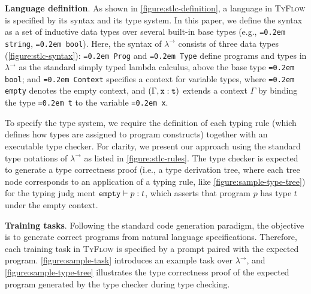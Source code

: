 \documentclass[manuscript,screen]{acmart}
\newcommand{\stlctype}[3]{{#1} \vdash {#2} : {#3}}
\newcommand{\toolname}[1]{\textsc{#1}}
\newcommand{\tcode}[1]{{\small \texttt{\spaceskip=0.2em #1}}}
\newcommand{\mainname}{\toolname{TyFlow}\xspace}
\newcommand{\stlc}{\lambda^{\rightarrow}}
\begin{document}
\smallskip 
\noindent \textbf{Language definition}. As shown in \autoref{figure:stlc-definition}, a language in \mainname is specified by its syntax and its type system.
%
In this paper, we define the syntax as a set of inductive data types over several built-in base types (e.g., \tcode{string}, \tcode{bool}). 
Here, the syntax of $\stlc$ consists of three data types (\autoref{figure:stlc-syntax}):
\tcode{Prog} and \tcode{Type} define programs and types in $\stlc$ as the standard simply typed lambda calculus, above the base type \tcode{bool}; and 
\tcode{Context} specifies a context for variable types, where \tcode{empty} denotes the empty context, and ${({\Gamma}, {\tt x}:{\tt t})}$ extends a context $\Gamma$ by binding the type \tcode{t} to the variable \tcode{x}.

To specify the type system, we require the definition of each typing rule (which defines how types are assigned to program constructs) together with an executable type checker.
For clarity, we present our approach using the standard type notations of $\stlc$ as listed in \autoref{figure:stlc-rules}.
The type checker is expected to generate a type correctness proof (i.e., a type derivation tree, where each tree node corresponds to an application of a typing rule, like \autoref{figure:sample-type-tree}) for the typing judg  ment $\stlctype{\tt empty}{p}{t}$, which asserts that program $p$ has type $t$ under the empty context.

\smallskip 
\noindent \textbf{Training tasks}. Following the standard code generation paradigm, the objective is to generate correct programs from natural language specifications. Therefore, each training task in \mainname is specified by a prompt paired with the expected program.
%
\autoref{figure:sample-task} introduces an example task over $\stlc$, and \autoref{figure:sample-type-tree} illustrates the type correctness proof of the expected program generated by the type checker during type checking.
\end{document}
